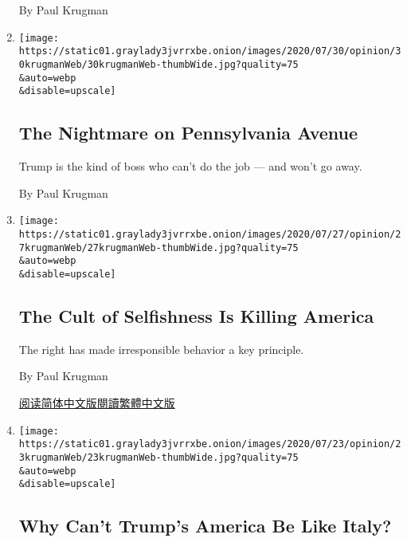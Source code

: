 \begin{enumerate}
  By Paul Krugman
\item
  \href{/2020/07/30/opinion/trump-coronavirus-economy.html}{}

  \texttt{[image: https://static01.graylady3jvrrxbe.onion/images/2020/07/30/opinion/30krugmanWeb/30krugmanWeb-thumbWide.jpg?quality=75\\\&auto=webp\\\&disable=upscale]}

  \hypertarget{the-nightmare-on-pennsylvania-avenue}{%
  \subsection{The Nightmare on Pennsylvania
  Avenue}\label{the-nightmare-on-pennsylvania-avenue}}

  Trump is the kind of boss who can't do the job --- and won't go away.

  By Paul Krugman
\item
  \href{/2020/07/27/opinion/us-republicans-coronavirus.html}{}

  \texttt{[image: https://static01.graylady3jvrrxbe.onion/images/2020/07/27/opinion/27krugmanWeb/27krugmanWeb-thumbWide.jpg?quality=75\\\&auto=webp\\\&disable=upscale]}

  \hypertarget{the-cult-of-selfishness-is-killing-america}{%
  \subsection{The Cult of Selfishness Is Killing
  America}\label{the-cult-of-selfishness-is-killing-america}}

  The right has made irresponsible behavior a key principle.

  By Paul Krugman

  \href{https://cn.nytimes3xbfgragh.onion/opinion/20200728/us-republicans-coronavirus/}{阅读简体中文版}\href{https://cn.nytimes3xbfgragh.onion/opinion/20200728/us-republicans-coronavirus/zh-hant/}{閱讀繁體中文版}
\item
  \href{/2020/07/23/opinion/us-italy-coronavirus.html}{}

  \texttt{[image: https://static01.graylady3jvrrxbe.onion/images/2020/07/23/opinion/23krugmanWeb/23krugmanWeb-thumbWide.jpg?quality=75\\\&auto=webp\\\&disable=upscale]}

  \hypertarget{why-cant-trumps-america-be-like-italy}{%
  \subsection{Why Can't Trump's America Be Like
  Italy?}\label{why-cant-trumps-america-be-like-italy}}


\end{enumerate}
